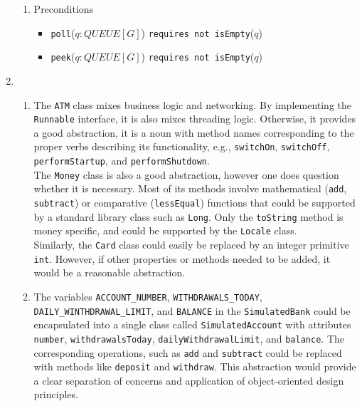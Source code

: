 \documentclass{report}
\begin{document}
\begin{enumerate}
\begin{enumerate}
		\item Preconditions		
		\begin{itemize}
			\item \texttt{poll}($q: QUEUE[G]$) \texttt{requires not isEmpty}($q$)
            \item \texttt{peek}($q: QUEUE[G]$) \texttt{requires not isEmpty}($q$)
		\end{itemize}
	\end{enumerate}

	\item 	
	\begin{enumerate}
		\item 
		The \texttt{ATM} class mixes business logic and networking. By implementing the \texttt{Runnable} interface, it is also mixes threading logic. Otherwise, 
		it provides a good abstraction, it is a noun with method names corresponding
		to the proper verbs describing its functionality, e.g., \texttt{switchOn},
		\texttt{switchOff}, \texttt{performStartup}, and \texttt{performShutdown}. \\
		
		The \texttt{Money} class is also a good abstraction, however one does question
		whether it is necessary. Most of its methods involve mathematical
    	(\texttt{add}, \texttt{subtract}) or comparative (\texttt{lessEqual})
    	functions that could be supported by a standard library class such as \texttt{Long}. Only the \texttt{toString} method is money specific,
    	and could be supported by the \texttt{Locale} class. \\
    	
    	Similarly, the \texttt{Card} class could easily be replaced by an
    	integer primitive \texttt{int}. However, if other properties or methods
    	needed to be added, it would be a reasonable abstraction.
		
		\item The variables \texttt{ACCOUNT\_NUMBER}, \texttt{WITHDRAWALS\_TODAY}, \texttt{DAILY\_WINTHDRAWAL\_LIMIT}, and \texttt{BALANCE}
		in the \texttt{SimulatedBank} could be encapsulated into
		a single class called \texttt{SimulatedAccount} with
		attributes \texttt{number}, \texttt{withdrawalsToday},
		\texttt{dailyWithdrawalLimit}, and \texttt{balance}.
        The corresponding operations, such as \texttt{add} and
        \texttt{subtract} could be replaced with methods like
        \texttt{deposit} and \texttt{withdraw}. This abstraction
        would provide a clear separation of concerns and 
        application of object-oriented design principles.
	\end{enumerate}


\end{enumerate}
\end{document}
